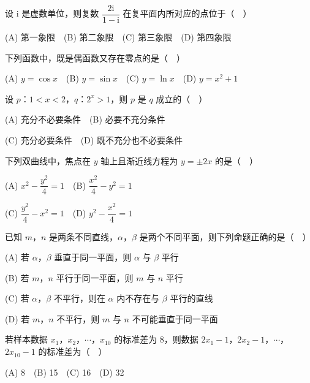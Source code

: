 \begin{question}
设 \(\mathrm{i}\) 是虚数单位，则复数 \(\dfrac{2\mathrm{i}}{1-\mathrm{i}}\) 在复平面内所对应的点位于（　）

(A) 第一象限　(B) 第二象限　(C) 第三象限　(D) 第四象限

\end{question}
\begin{question}
下列函数中，既是偶函数又存在零点的是（　）

(A) \(y=\cos x\)　(B) \(y=\sin x\)　(C) \(y=\ln x\)　(D) \(y=x^2+1\)

\end{question}
\begin{question}
设 \(p\)：\(1<x<2\)，\(q\)：\(2^x>1\)，则 \(p\) 是 \(q\) 成立的（　）

(A) 充分不必要条件　(B) 必要不充分条件

(C) 充分必要条件　(D) 既不充分也不必要条件

\end{question}
\begin{question}
下列双曲线中，焦点在 \(y\) 轴上且渐近线方程为 \(y=\pm 2x\) 的是（　）

(A) \(x^2-\dfrac{y^2}{4}=1\)　(B) \(\dfrac{x^2}{4}-y^2=1\)

(C) \(\dfrac{y^2}{4}-x^2=1\)　(D) \(y^2-\dfrac{x^2}{4}=1\)

\end{question}
\begin{question}
已知 \(m\)，\(n\) 是两条不同直线，\(\alpha\)，\(\beta\) 是两个不同平面，则下列命题正确的是（　）

(A) 若 \(\alpha\)，\(\beta\) 垂直于同一平面，则 \(\alpha\) 与 \(\beta\) 平行

(B) 若 \(m\)，\(n\) 平行于同一平面，则 \(m\) 与 \(n\) 平行

(C) 若 \(\alpha\)，\(\beta\) 不平行，则在 \(\alpha\) 内不存在与 \(\beta\) 平行的直线

(D) 若 \(m\)，\(n\) 不平行，则 \(m\) 与 \(n\) 不可能垂直于同一平面

\end{question}
\begin{question}
若样本数据 \(x_1\)，\(x_2\)，\(\cdots\)，\(x_{10}\) 的标准差为 8，则数据 \(2x_1-1\)，\(2x_2-1\)，\(\cdots\)，\(2x_{10}-1\) 的标准差为（　）

(A) 8　(B) 15　(C) 16　(D) 32

\Needspace{0.4\textheight}
\end{question}
